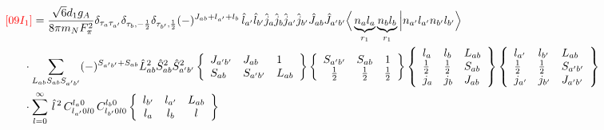 \documentclass[master]{shnuthesis}
\newcommand{\ap}{a^\prime}
\newcommand{\bp}{b^\prime}
\newcommand{\il}{\!\!\!\!\!\!\!\!\!\!}
\begin{document}
\begin{align}
    &\il {\color{red} [09I_1]} = \frac{\sqrt{6}d_1 g_A}{8\pi m_N F_{\pi}^2} \delta_{\tau_a \tau_{\ap}}\delta_{\tau_b, -\frac{1}{2}}\delta_{\tau_{\bp}, \frac{1}{2}} (-)^{J_{ab}+l_{\ap}+l_b}\,\hat{l}_{\ap}\hat{l}_{\bp}\hat{j}_a\hat{j}_b\hat{j}_{\ap}\hat{j}_{\bp}\hat{J}_{ab}\hat{J}_{\ap\bp} \Big\langle \underbrace{n_a l_a}_{r_1} \underbrace{n_b l_b}_{r_1} \Big| n_{\ap} l_{\ap} n_{\bp} l_{\bp} \Big\rangle \notag \\
    & \cdot \sum_{L_{ab}S_{ab}S_{\ap\bp}} (-)^{S_{\ap\bp}+S_{ab}}\hat{L}_{ab}^2\hat{S}_{ab}^2\hat{S}_{\ap\bp}^2  \left\{\begin{array}{lll} J_{\ap\bp} & J_{ab} & 1 \\ S_{ab} & S_{\ap\bp} & L_{ab} \end{array}\right\}    \left\{\begin{array}{ccc} S_{\ap\bp} & S_{ab} & 1 \\ \frac{1}{2} & \frac{1}{2} & \frac{1}{2} \end{array}\right\}  \left\{\begin{array}{lll}l_{a} & l_{b} & L_{ab} \\ \frac{1}{2} & \frac{1}{2} & S_{ab} \\j_{a} & j_{b} & J_{ab} \end{array}\right\}  \left\{\begin{array}{lll}l_{\ap} & l_{\bp} & L_{ab} \\ \frac{1}{2} & \frac{1}{2} & S_{\ap\bp} \\j_{\ap} & j_{\bp} & J_{\ap\bp} \end{array}\right\}  \notag\\
    & \cdot \sum_{l=0}^\infty \,\hat{l}^{\,2}\,C_{l_{\ap} 0 l 0}^{l_a 0} \,C_{l_{\bp} 0 l 0}^{l_b 0}  \left\{\begin{array}{ccc} l_{\bp} & l_{\ap} & L_{ab} \\ l_a & l_b & l \end{array}\right\}
\end{align}
\,\\
\end{document}
